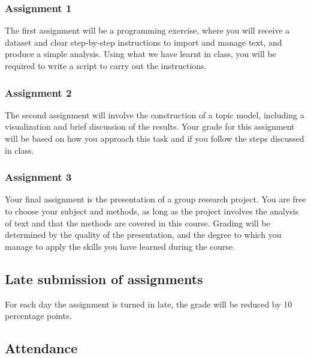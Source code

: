 \documentclass[
]{article}
\begin{document}
\hypertarget{assignment-1}{%
\subsubsection{Assignment 1}\label{assignment-1}}

The first assignment will be a programming exercise, where you will
receive a dataset and clear step-by-step instructions to import and
manage text, and produce a simple analysis. Using what we have learnt in
class, you will be required to write a script to carry out the
instructions.

\hypertarget{assignment-2}{%
\subsubsection{Assignment 2}\label{assignment-2}}

The second assignment will involve the construction of a topic model,
including a visualization and brief discussion of the results. Your
grade for this assignment will be based on how you approach this task
and if you follow the steps discussed in class.

\hypertarget{assignment-3}{%
\subsubsection{Assignment 3}\label{assignment-3}}

Your final assignment is the presentation of a group research project.
You are free to choose your subject and methods, as long as the project
involves the analysis of text and that the methods are covered in this
course. Grading will be determined by the quality of the presentation,
and the degree to which you manage to apply the skills you have learned
during the course.

\hypertarget{late-submission-of-assignments}{%
\subsection{Late submission of
assignments}\label{late-submission-of-assignments}}

For each day the assignment is turned in late, the grade will be reduced
by 10 percentage points.

\hypertarget{attendance}{%
\subsection{Attendance}\label{attendance}}
\end{document}
